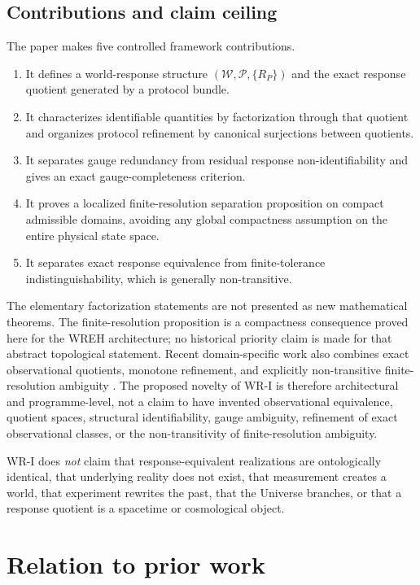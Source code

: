 \documentclass[11pt]{article}
\newcommand{\W}{\mathcal W}
\newcommand{\Pcal}{\mathcal P}
\begin{document}
\subsection*{Contributions and claim ceiling}

The paper makes five controlled framework contributions.
\begin{enumerate}[label=(\roman*)]
\item It defines a world-response structure $(\W,\Pcal,\{R_P\})$ and the exact
response quotient generated by a protocol bundle.
\item It characterizes identifiable quantities by factorization through that
quotient and organizes protocol refinement by canonical surjections between
quotients.
\item It separates gauge redundancy from residual response
non-identifiability and gives an exact gauge-completeness criterion.
\item It proves a localized finite-resolution separation proposition on
compact admissible domains, avoiding any global compactness assumption on the
entire physical state space.
\item It separates exact response equivalence from finite-tolerance
indistinguishability, which is generally non-transitive.
\end{enumerate}

The elementary factorization statements are not presented as new mathematical
theorems. The finite-resolution proposition is a compactness consequence
proved here for the WREH architecture; no historical priority claim is made for
that abstract topological statement. Recent domain-specific work also combines
exact observational quotients, monotone refinement, and explicitly
non-transitive finite-resolution ambiguity \cite{SimonsWashburn2026}. The
proposed novelty of WR-I is therefore architectural and programme-level, not a
claim to have invented observational equivalence, quotient spaces, structural
identifiability, gauge ambiguity, refinement of exact observational classes, or
the non-transitivity of finite-resolution ambiguity.

WR-I does \emph{not} claim that response-equivalent realizations are
ontologically identical, that underlying reality does not exist, that
measurement creates a world, that experiment rewrites the past, that the
Universe branches, or that a response quotient is a spacetime or cosmological
object.

\section{Relation to prior work}
\end{document}
